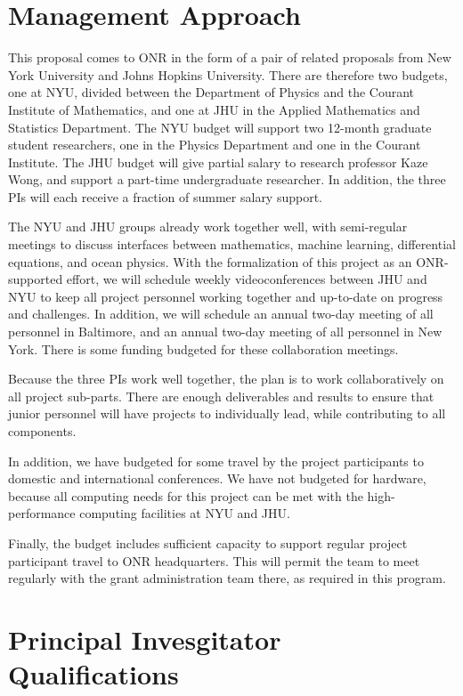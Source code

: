 \documentclass[11pt]{article}
\begin{document}
\section{Management Approach}
This proposal comes to ONR in the form of a pair of related proposals from New York University and Johns Hopkins University.
There are therefore two budgets, one at NYU, divided between the Department of Physics and the Courant Institute of Mathematics, and one at JHU in the Applied Mathematics and Statistics Department.
The NYU budget will support two 12-month graduate student researchers, one in the Physics Department and one in the Courant Institute.
The JHU budget will give partial salary to research professor Kaze Wong, and support a part-time undergraduate researcher.
In addition, the three PIs will each receive a fraction of summer salary support.

The NYU and JHU groups already work together well, with semi-regular meetings to discuss interfaces between mathematics, machine learning, differential equations, and ocean physics.
With the formalization of this project as an ONR-supported effort, we will schedule weekly videoconferences between JHU and NYU to keep all project personnel working together and up-to-date on progress and challenges.
In addition, we will schedule an annual two-day meeting of all personnel in Baltimore, and an annual two-day meeting of all personnel in New York.
There is some funding budgeted for these collaboration meetings.

Because the three PIs work well together, the plan is to work collaboratively on all project sub-parts.
There are enough deliverables and results to ensure that junior personnel will have projects to individually lead, while contributing to all components.

In addition, we have budgeted for some travel by the project participants to domestic and international conferences.
We have not budgeted for hardware, because all computing needs for this project can be met with the high-performance computing facilities at NYU and JHU.

Finally, the budget includes sufficient capacity to support regular project participant travel to ONR headquarters.
This will permit the team to meet regularly with the grant administration team there, as required in this program.

\section{Principal Invesgitator Qualifications}
\end{document}

